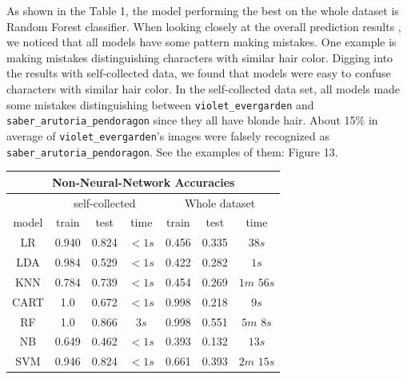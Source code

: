 \documentclass[11.5pt]{article}
\begin{document}
\begin{enumerate}
\begin{itemize}
            \begin{minipage}{0.45\textwidth}
                As shown in the Table 1, the model performing the best on the whole dataset is Random Forest classifier. When looking closely at the overall prediction results , we noticed that all models have some pattern making mistakes.
                One example is making mistakes distinguishing characters with similar hair color.
                Digging into the results with self-collected data, we found that models were easy to confuse characters with similar hair color.
                In the self-collected data set, all models made some mistakes distinguishing between \texttt{violet\_evergarden} and \texttt{saber\_arutoria\_pendoragon} since they all have blonde hair.
                About 15\% in average of \texttt{violet\_evergarden}'s images were falsely recognized as \texttt{saber\_arutoria\_pendoragon}.
                See the examples of them: Figure 13.
            \end{minipage}
            \begin{minipage}{0.3\textwidth}
                \begin{tabular}{|c|c|c|c|c|c|c|}
                    \multicolumn{7}{c}{\textbf{Non-Neural-Network Accuracies}}\\
                    \hline
                    & \multicolumn{3}{|c|}{self-collected} & \multicolumn{3}{|c|}{Whole dataset} \\ \hline
                    model & train & test & time & train & test & time \\ \hline
                    LR & 0.940 & 0.824 & $<1s$ & 0.456 & 0.335 & $38s$ \\ \hline
                    LDA & 0.984 & 0.529 & $<1s$ & 0.422 & 0.282 & $1s$ \\ \hline
                    KNN & 0.784 & 0.739 & $<1s$ & 0.454 & 0.269 & $1m$ $56s$ \\ \hline
                    CART & 1.0 & 0.672 & $<1s$ & 0.998 & 0.218 & $9s$ \\ \hline
                    RF & 1.0 & 0.866 & $3s$ & 0.998 & 0.551 & $5m$ $8s$\\ \hline
                    NB & 0.649 & 0.462 & $<1s$ & 0.393 & 0.132 & $13s$ \\ \hline
                    SVM & 0.946 & 0.824 & $<1s$ & 0.661 & 0.393 & $2m$ $15s$ \\ \hline
                \end{tabular}
            \end{minipage}



\end{itemize}
\end{enumerate}
\end{document}

